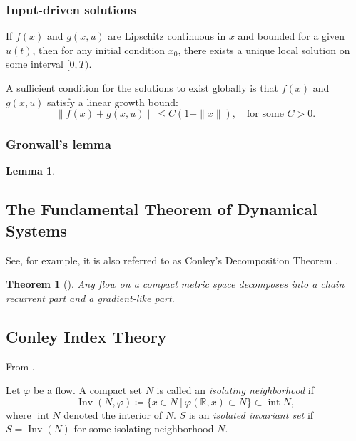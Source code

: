 \documentclass{article}
\newtheorem{theorem}{Theorem}
\newtheorem{lemma}{Lemma}
\theoremstyle{definition} \newtheorem{definition}{Definition}
\theoremstyle{remark} \newtheorem{remark}{Remark}
\newcommand{\reals}{\mathbb{R}}
\newcommand{\inv}{\operatorname{Inv}}
\newcounter{ct}
\begin{document}

\subsubsection{Input-driven solutions}\label{sec:inputunique}
If \( f(x) \) and \( g(x,u) \) are Lipschitz continuous in \( x \) and bounded for a given \( u(t) \), then for any initial condition \( x_0 \), there exists a unique local solution on some interval \( [0,T) \).  

A sufficient condition for the solutions to exist globally is that \( f(x) \) and \( g(x,u) \) satisfy a linear growth bound:  
\[
\| f(x) + g(x,u) \| \leq C (1 + \| x \|), \quad \text{for some } C > 0.
\]



\subsubsection{Gronwall's lemma}\label{sec:gronwall}
\begin{lemma}\label{lemma:gronwall}

\end{lemma}

\subsection{The Fundamental Theorem of Dynamical Systems}\label{sec:fundamental}
See, for example\citep{conley1978morse, norton1995fundamental}, it is also referred to as Conley's Decomposition Theorem \citep{mischaikow1999cit}.

\begin{theorem}[\citep{conley1978morse}]
 Any flow on a compact metric space decomposes into a chain recurrent part and a gradient-like part.
\end{theorem}



\subsection{Conley Index Theory}\label{sec:cit}
From \citet{mischaikow1999cit}.

Let $\varphi$ be a flow. A compact set $N$ is called an \emph{isolating neighborhood} if 
\[
\inv(N,\varphi) \coloneqq \{x\in N\ | \ \varphi(\reals,x)\subset N\} \subset \operatorname{int} N,
\]
where $ \operatorname{int} N$ denoted the interior of $N$. 
$S$ is an \emph{isolated invariant set} if $S=\inv(N)$ for some isolating neighborhood $N$.
\end{document}
